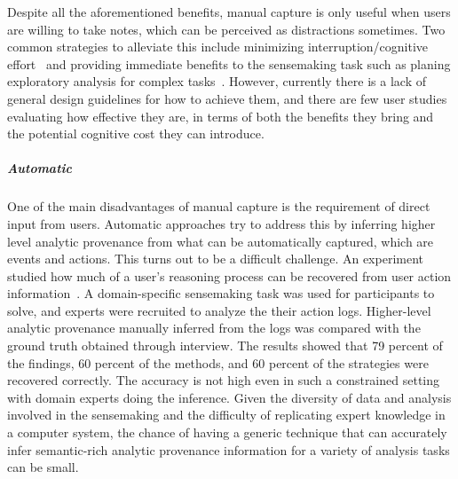 Despite all the aforementioned benefits, manual capture is only useful when users are willing to take notes, which can be perceived as distractions sometimes. Two common strategies to alleviate this include minimizing interruption/cognitive effort~\cite{Hong2008} and providing immediate benefits to the sensemaking task such as planing exploratory analysis for complex tasks~\cite{Lunzer2014}. However, currently there is a lack of general design guidelines for how to achieve them, and there are few user studies evaluating how effective they are, in terms of both the benefits they bring and the potential cognitive cost they can introduce. 




\subparagraph{Automatic}
One of the main disadvantages of manual capture is the requirement of direct input from users. Automatic approaches try to address this by inferring higher level analytic provenance from what can be automatically captured, which are events and actions. This turns out to be a difficult challenge. An experiment studied how much of a user's reasoning process can be recovered from user action information~\cite{Dou2009}. A domain-specific sensemaking task was used for participants to solve, and experts were recruited to analyze the their action logs. Higher-level analytic provenance manually inferred from the logs was compared with the ground truth obtained through interview. The results showed that 79 percent of the findings, 60 percent of the methods, and 60 percent of the strategies were recovered correctly. The accuracy is not high even in such a constrained setting with domain experts doing the inference. Given the diversity of data and analysis involved in the sensemaking and the difficulty of replicating expert knowledge in a computer system, the chance of having a generic technique that can accurately infer semantic-rich analytic provenance information for a variety of analysis tasks can be small.


